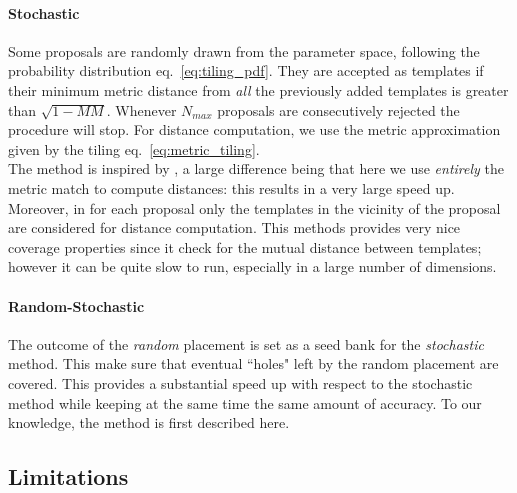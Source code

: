 \documentclass[twocolumn,showpacs,preprintnumbers,nofootinbib,prd,
superscriptaddress,10pt]{revtex4-2}
\begin{document}
\paragraph{Stochastic}\label{par:stochastic}
Some proposals are randomly drawn from the parameter space, following the probability distribution eq.~\eqref{eq:tiling_pdf}. They are accepted as templates if their minimum metric distance from {\it all} the previously added templates is greater than  $\sqrt{1-MM}$.
Whenever $N_{max}$ proposals are consecutively rejected the procedure will stop. For distance computation, we use the metric approximation given by the tiling eq.~\eqref{eq:metric_tiling}.
\\
The method is inspired by \cite{PhysRevD.80.104014}, a large difference being that here we use {\it entirely} the metric match to compute distances: this results in a very large speed up. Moreover, in \cite{PhysRevD.80.104014} for each proposal only the templates in the vicinity of the proposal are considered for distance computation.
This methods provides very nice coverage properties since it check for the mutual distance between templates; however it can be quite slow to run, especially in a large number of dimensions.

\paragraph{Random-Stochastic}\label{par:randomstochastic}
The outcome of the {\it random} placement is set as a seed bank for the {\it stochastic} method. This make sure that eventual ``holes" left by the random placement are covered. This provides a substantial speed up with respect to the stochastic method while keeping at the same time the same amount of accuracy.
To our knowledge, the method is first described here.



\subsection{Limitations} \label{sec:limitations}
\end{document}
